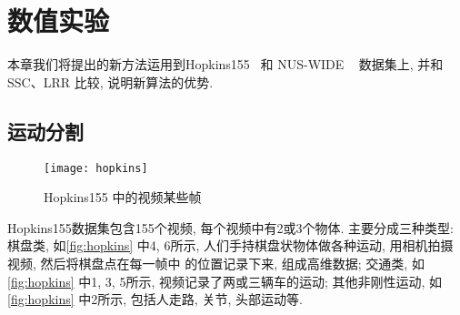 \chapter{数值实验}\label{chp:experiments}
本章我们将提出的新方法运用到Hopkins155~\cite{tron2007benchmark} 和 NUS-WIDE
~\cite{chua2009nus} 数据集上, 并和SSC、LRR 比较, 说明新算法的优势.

\section{运动分割}
\begin{figure}[hb]
  \centering
  \texttt{[image: hopkins]}
  \caption{Hopkins155 中的视频某些帧}
  \label{fig:hopkins}
\end{figure}
Hopkins155数据集包含155个视频, 每个视频中有2或3个物体.
主要分成三种类型: 棋盘类, 如\autoref{fig:hopkins} 中4, 6所示,
人们手持棋盘状物体做各种运动, 用相机拍摄视频, 然后将棋盘点在每一帧中
的位置记录下来, 组成高维数据; 交通类, 如\autoref{fig:hopkins} 中1, 3, 5所示,
视频记录了两或三辆车的运动; 其他非刚性运动, 如\autoref{fig:hopkins} 中2所示,
包括人走路, 关节, 头部运动等.

